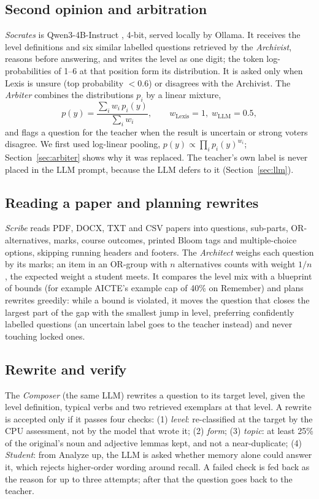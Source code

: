 \documentclass[conference]{IEEEtran}
\begin{document}
\subsection{Second opinion and arbitration}
\emph{Socrates} is Qwen3-4B-Instruct \cite{qwen3}, 4-bit, served locally by Ollama. It receives the
level definitions and six similar labelled questions retrieved by the \emph{Archivist}, reasons
before answering, and writes the level as one digit; the token log-probabilities of 1--6 at that
position form its distribution. It is asked only when Lexis is unsure (top probability $<0.6$) or
disagrees with the Archivist. The \emph{Arbiter} combines the distributions $p_i$ by a linear
mixture,
\begin{equation}
p(y) = \frac{\sum_i w_i\, p_i(y)}{\sum_i w_i},\qquad w_{\mathrm{Lexis}}=1,\; w_{\mathrm{LLM}}=0.5,
\end{equation}
and flags a question for the teacher when the result is uncertain or strong voters disagree.
We first used log-linear pooling, $p(y)\propto\prod_i p_i(y)^{w_i}$; Section~\ref{sec:arbiter}
shows why it was replaced. The teacher's own label is never placed in the LLM prompt, because
the LLM defers to it (Section~\ref{sec:llm}).

\subsection{Reading a paper and planning rewrites}
\emph{Scribe} reads PDF, DOCX, TXT and CSV papers into questions, sub-parts, OR-alternatives,
marks, course outcomes, printed Bloom tags and multiple-choice options, skipping running headers
and footers. The \emph{Architect} weighs each question by its marks; an item in an OR-group with
$n$ alternatives counts with weight $1/n$, the expected weight a student meets. It compares the
level mix with a blueprint of bounds (for example AICTE's example cap of 40\% on Remember) and
plans rewrites greedily: while a bound is violated, it moves the question that closes the largest
part of the gap with the smallest jump in level, preferring confidently labelled questions (an
uncertain label goes to the teacher instead) and never touching locked ones.

\subsection{Rewrite and verify}
The \emph{Composer} (the same LLM) rewrites a question to its target level, given the level
definition, typical verbs and two retrieved exemplars at that level. A rewrite is accepted only if
it passes four checks: (1) \emph{level}: re-classified at the target by the CPU assessment, not by
the model that wrote it; (2) \emph{form}; (3) \emph{topic}: at least 25\% of the original's noun and
adjective lemmas kept, and not a near-duplicate; (4) \emph{Student}: from Analyze up, the LLM is
asked whether memory alone could answer it, which rejects higher-order wording around recall. A
failed check is fed back as the reason for up to three attempts; after that the question goes back
to the teacher.
\end{document}
